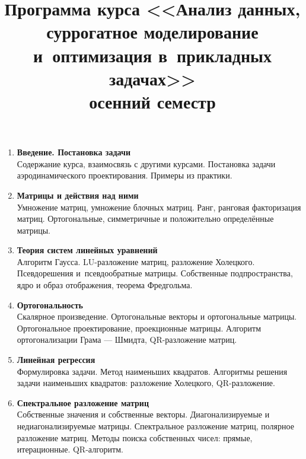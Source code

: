 \documentclass[12pt,oneside,openany]{article}
\begin{document}
\title{
  \large
  \textbf{Программа курса <<Анализ данных, суррогатное моделирование и~оптимизация в~прикладных задачах>>} \\
  осенний семестр
}

\author{}
\date{}

\maketitle
\thispagestyle{empty}

\vspace{-10ex}


\begin{enumerate}

  \item \textbf{Введение. Постановка задачи} \\
  Содержание курса, взаимосвязь с другими курсами. Постановка задачи аэродинамического проектирования. Примеры из практики.

  \item \textbf{Матрицы и действия над ними} \\
  Умножение матриц, умножение блочных матриц. Ранг, ранговая факторизация матриц. Ортогональные, симметричные и положительно определённые матрицы.

  \item \textbf{Теория систем линейных уравнений} \\
  Алгоритм Гаусса. LU-разложение матриц, разложение Холецкого. Псевдорешения и~псевдообратные матрицы. Собственные подпространства, ядро и образ отображения, теорема Фредгольма.

  \item \textbf{Ортогональность} \\
  Скалярное произведение. Ортогональные векторы и ортогональные матрицы. Ортогональное проектирование, проекционные матрицы. Алгоритм ортогонализации Грама --- Шмидта, QR-разложение матриц.

  \item \textbf{Линейная регрессия} \\
  Формулировка задачи. Метод наименьших квадратов. Алгоритмы решения задачи наименьших квадратов: разложение Холецкого, QR-разложение.

  \item \textbf{Спектральное разложение матриц} \\
  Собственные значения и собственные векторы. Диагонализируемые и недиагонализируемые матрицы. Спектральное разложение матриц, полярное разложение матриц. Методы поиска собственных чисел: прямые, итерационные. QR-алгоритм.


\end{enumerate}
\end{document}
